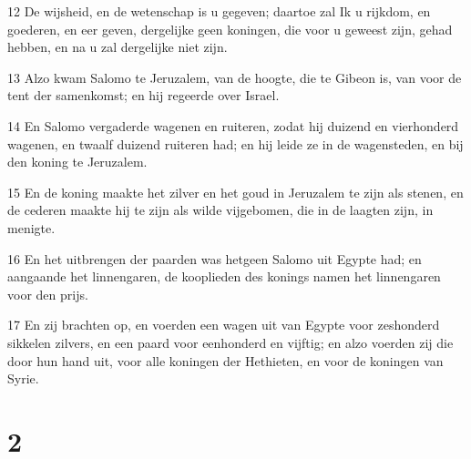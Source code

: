 \par 12 De wijsheid, en de wetenschap is u gegeven; daartoe zal Ik u rijkdom, en goederen, en eer geven, dergelijke geen koningen, die voor u geweest zijn, gehad hebben, en na u zal dergelijke niet zijn.
\par 13 Alzo kwam Salomo te Jeruzalem, van de hoogte, die te Gibeon is, van voor de tent der samenkomst; en hij regeerde over Israel.
\par 14 En Salomo vergaderde wagenen en ruiteren, zodat hij duizend en vierhonderd wagenen, en twaalf duizend ruiteren had; en hij leide ze in de wagensteden, en bij den koning te Jeruzalem.
\par 15 En de koning maakte het zilver en het goud in Jeruzalem te zijn als stenen, en de cederen maakte hij te zijn als wilde vijgebomen, die in de laagten zijn, in menigte.
\par 16 En het uitbrengen der paarden was hetgeen Salomo uit Egypte had; en aangaande het linnengaren, de kooplieden des konings namen het linnengaren voor den prijs.
\par 17 En zij brachten op, en voerden een wagen uit van Egypte voor zeshonderd sikkelen zilvers, en een paard voor eenhonderd en vijftig; en alzo voerden zij die door hun hand uit, voor alle koningen der Hethieten, en voor de koningen van Syrie.

\chapter{2}

